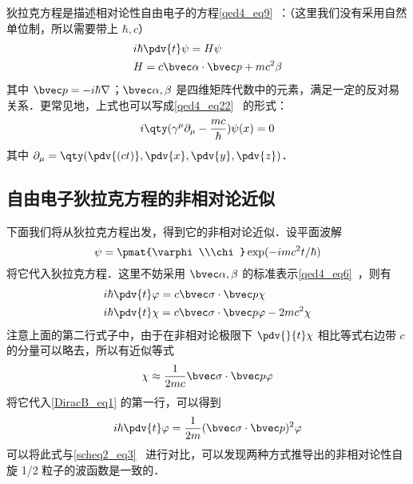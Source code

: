 

狄拉克方程是描述相对论性自由电子的方程\autoref{qed4_eq9}~：（这里我们没有采用自然单位制，所以需要带上 $\hbar,c$）
\begin{equation}
\begin{aligned}
&i\hbar \pdv{t} \psi = H\psi\\
&H=c\bvec \alpha\cdot \bvec p+mc^2\beta
\end{aligned}
\end{equation}
其中 $\bvec p=-i\hbar\nabla$；$\bvec \alpha,\beta$ 是四维矩阵代数中的元素，满足一定的反对易关系．更常见地，上式也可以写成\autoref{qed4_eq22}~ 的形式：
\begin{equation}
i\qty(\gamma^\mu \partial_\mu-\frac{mc}{\hbar})\psi(x)=0
\end{equation}
其中 $\partial_\mu=\qty(\pdv{(ct)},\pdv{x},\pdv{y},\pdv{z})$．

\subsection{自由电子狄拉克方程的非相对论近似}

下面我们将从狄拉克方程出发，得到它的非相对论近似．设平面波解
\begin{equation}
\psi=\pmat{\varphi\\\chi}\exp(-imc^2t/\hbar)
\end{equation}
将它代入狄拉克方程．这里不妨采用 $\bvec \alpha,\beta$ 的标准表示\autoref{qed4_eq6}~，则有
\begin{equation}\label{DiracB_eq1}
\begin{aligned}
&i\hbar\pdv{t} \varphi=c\bvec \sigma\cdot \bvec p \chi\\
&i\hbar\pdv{t} \chi = c\bvec \sigma\cdot \bvec p \varphi -2mc^2 \chi 
\end{aligned}
\end{equation}
注意上面的第二行式子中，由于在非相对论极限下 $\pdv{}{t} \chi$ 相比等式右边带 $c$ 的分量可以略去，所以有近似等式
\begin{equation}
\chi\approx \frac{1}{2mc} \bvec \sigma\cdot \bvec p \varphi
\end{equation}
将它代入\autoref{DiracB_eq1} 的第一行，可以得到
\begin{equation}\label{DiracB_eq2}
i\hbar\pdv{t} \varphi=\frac{1}{2m}(\bvec \sigma\cdot \bvec p)^2 \varphi
\end{equation}
可以将此式与\autoref{scheq2_eq3}~ 进行对比，可以发现两种方式推导出的非相对论性自旋 1/2 粒子的波函数是一致的．
